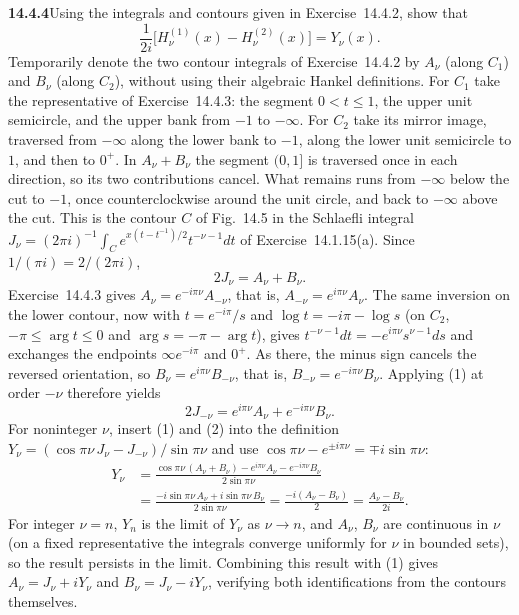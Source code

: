 \par\bigskip
\noindent\textbf{14.4.4}\quad Using the integrals and contours given in
Exercise~14.4.2, show that
\[
\frac{1}{2i}\big[H_{\nu}^{(1)}(x)-H_{\nu}^{(2)}(x)\big]=Y_{\nu}(x).
\]
\solution
Temporarily denote the two contour integrals of Exercise~14.4.2 by
$A_\nu$ (along $C_1$) and $B_\nu$ (along $C_2$), without using their
algebraic Hankel definitions. For $C_1$ take the representative of
Exercise~14.4.3: the segment $0<t\le1$, the upper unit semicircle,
and the upper bank from $-1$ to $-\infty$. For $C_2$ take its mirror
image, traversed from $-\infty$ along the lower bank to $-1$, along
the lower unit semicircle to $1$, and then to $0^+$. In
$A_\nu+B_\nu$ the segment $(0,1]$ is traversed once in each
direction, so its two contributions cancel. What remains runs from
$-\infty$ below the cut to $-1$, once counterclockwise around the
unit circle, and back to $-\infty$ above the cut. This is the
contour $C$ of Fig.~14.5 in the Schlaefli integral
$J_\nu=(2\pi i)^{-1}\int_Ce^{x(t-t^{-1})/2}t^{-\nu-1}dt$ of
Exercise~14.1.15(a). Since $1/(\pi i)=2/(2\pi i)$,
\[
2J_\nu=A_\nu+B_\nu.
\tag{1}
\]
Exercise~14.4.3 gives $A_\nu=e^{-i\pi\nu}A_{-\nu}$, that is,
$A_{-\nu}=e^{i\pi\nu}A_\nu$. The same inversion on the lower
contour, now with $t=e^{-i\pi}/s$ and $\log t=-i\pi-\log s$ (on
$C_2$, $-\pi\le\arg t\le0$ and $\arg s=-\pi-\arg t$), gives
$t^{-\nu-1}dt=-e^{i\pi\nu}s^{\nu-1}ds$ and exchanges the endpoints
$\infty e^{-i\pi}$ and $0^+$. As there, the minus sign cancels the
reversed orientation, so $B_\nu=e^{i\pi\nu}B_{-\nu}$, that is,
$B_{-\nu}=e^{-i\pi\nu}B_\nu$.
Applying (1) at order $-\nu$ therefore yields
\[
2J_{-\nu}=e^{i\pi\nu}A_\nu+e^{-i\pi\nu}B_\nu.
\tag{2}
\]
For noninteger $\nu$, insert (1) and (2) into the definition
$Y_\nu=(\cos\pi\nu\,J_\nu-J_{-\nu})/\sin\pi\nu$ and use
$\cos\pi\nu-e^{\pm i\pi\nu}=\mp i\sin\pi\nu$:
\begin{align*}
Y_\nu
&=\frac{\cos\pi\nu\,(A_\nu+B_\nu)
-e^{i\pi\nu}A_\nu-e^{-i\pi\nu}B_\nu}{2\sin\pi\nu}\\
&=\frac{-i\sin\pi\nu\,A_\nu
+i\sin\pi\nu\,B_\nu}{2\sin\pi\nu}
=\frac{-i(A_\nu-B_\nu)}2
=\boxed{\frac{A_\nu-B_\nu}{2i}}.
\end{align*}
For integer $\nu=n$, $Y_n$ is the limit of $Y_\nu$ as $\nu\to n$,
and $A_\nu$, $B_\nu$ are continuous in $\nu$ (on a fixed
representative the integrals converge uniformly for $\nu$ in
bounded sets), so the result persists in the limit. Combining
this result with (1) gives $A_\nu=J_\nu+iY_\nu$ and
$B_\nu=J_\nu-iY_\nu$, verifying both identifications from the
contours themselves.

